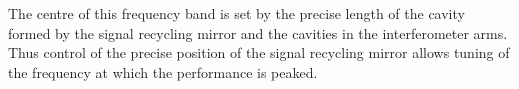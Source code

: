 \documentclass{article}
\begin{document}

The centre of this frequency band is set by the precise length of the cavity
formed by the signal recycling mirror and the cavities in the interferometer
arms. Thus control of the precise position of the signal recycling mirror allows
tuning of the frequency at which the performance is peaked.
\end{document}
